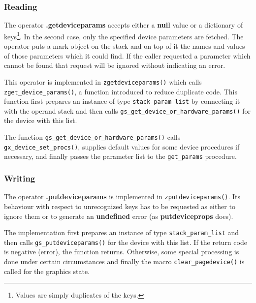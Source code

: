 \documentclass[twoside,a4paper]{article}
\newcommand{\ps}[1]{{\sffamily\bfseries #1}}	%
\newcommand{\prog}[1]{\texttt{#1}}
\newif\ifdraft \draftfalse
\begin{document}

\subsubsection{Reading}

The operator \ps{.getdeviceparams} accepts either a \ps{null} value or a
dictionary of keys\footnote{Values are simply duplicates of the keys.}.
In the second case, only the specified device parameters are fetched.
The operator puts a mark object on the stack and on top of it the
names and values of those parameters which it could find.
If the caller requested a parameter which cannot be found
that request will be ignored without indicating an error.

\ifdraft
??? CHECK
\fi

This operator is implemented in \prog{zgetdeviceparams()} which calls
\prog{zget\_device\_params()},
a function introduced to reduce duplicate code.
This function first prepares an instance of type \prog{stack\_param\_list}
by connecting it with the operand stack
and then calls \prog{gs\_get\_device\_or\_hardware\_params()} for the device
with this list.

\ifdraft
??? Discuss selection.
\fi

The function \prog{gs\_get\_device\_or\_hardware\_params()} calls
\prog{gx\_device\_set\_procs()},
supplies default values for some device procedures if necessary,
and finally passes the parameter list to the \prog{get\_params} procedure.


\subsubsection{Writing}

The operator \ps{.putdeviceparams} is implemented in \prog{zputdeviceparams()}.
Its behaviour with respect to unrecognized keys has to be requested as
either to ignore them or to generate an \ps{undefined} error
(as \ps{putdeviceprops} does).

The implementation first prepares an instance of type \prog{stack\_param\_list}
and then calls \prog{gs\_put\-device\-params()} for the device
with this list.
If the return code is negative (error), the function returns.
Otherwise, some special processing is done under certain circumstances
and finally the macro \prog{clear\_\-page\-device()} is called for the graphics
state.
\end{document}
